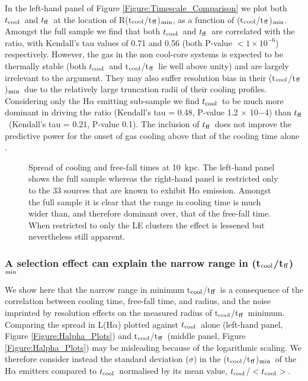 \documentclass[twocolumn]{aastex6}
\newcommand{\tctff}{{t$_{\rm cool}$/t$_{\rm ff}$}}
\newcommand{\tctffmin}{(\tctff)$_{\rm min}$}
\newcommand{\Rtctffmin}{R(\tctff)$_{\rm min}$}
\newcommand{\tc}{$t_{\rm cool}$}
\newcommand{\tff}{$t_{\rm ff}$}
\begin{document}
In the left-hand panel of Figure \ref{Figure:Timescale_Comparison} we plot both \tc\ and \tff\ at the location of \Rtctffmin, as a function of \tctffmin.  Amongst the full sample we find that both \tc\ and \tff\ are correlated with the ratio, with Kendall’s tau values of 0.71 and 0.56 (both P-value $< 1 \times 10^{-6}$) respectively.  However, the gas in the non cool-core systems is expected to be thermally stable (both \tc\ and \tctff\ lie well above unity) and are largely irrelevant to the argument.  They may also suffer resolution bias in their \tctffmin\ due to the relatively large truncation radii of their cooling profiles. Considering only the H$\alpha$ emitting sub-sample we find \tc\ to be much more dominant in driving the ratio (Kendall’s tau = 0.48, P-value 1.2 × 10−4) than \tff\ (Kendall’s tau = 0.21, P-value 0.1).   The inclusion of \tff\ does not improve the predictive power for the onset of gas cooling above that of the cooling time alone \cite[Section \ref{subsection:Thresholds}, see also][]{McNamara16}. 

\begin{figure*}    
  \centering
  \caption{Spread of cooling and free-fall times at 10~kpc. The left-hand panel shows the full sample whereas the right-hand panel is restricted only to the 33 sources that are known to exhibit H$\alpha$ emission.  Amongst the full sample it is clear that the range in cooling time is much wider than, and therefore dominant over, that of the free-fall time.  When restricted to only the LE clusters the effect is lessened but nevertheless still apparent.}
 \label{Figure:Histogram_DIRECT}
\end{figure*}


\subsubsection{A selection effect can explain the narrow range in \tctffmin} \label{Section:Narrowing}

We show here that the narrow range in minimum \tctff\ is a consequence of the correlation between cooling time, free-fall time, and radius, and the noise imprinted by resolution effects on the measured radius of \tctff\ minimum.  Comparing the spread in L(H$\alpha$) plotted against \tc\ alone (left-hand panel, Figure \ref{Figure:Halpha_Plots}) and \tctff\ (middle panel, Figure \ref{Figure:Halpha_Plots}) may be misleading because of the logarithmic scaling.  We therefore consider instead the standard deviation ($\sigma$) in the \tctffmin\ of the H$\alpha$ emitters  compared to \tc\ normalised by its mean value,  \tc/$<$\tc$>$.
\end{document}
